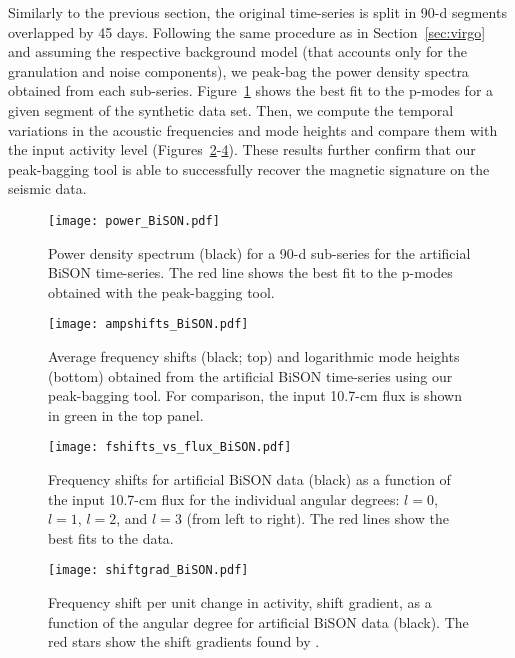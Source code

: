 \documentclass[twocolumn]{aastex61}%
\begin{document}
Similarly to the previous section, the original time-series is split in 90-d segments overlapped by 45 days. Following the same procedure as in Section~\ref{sec:virgo} and assuming the respective background model (that accounts only for the granulation and noise components), we peak-bag the power density spectra obtained from each sub-series.
Figure~\ref{fig:powersbison} shows the best fit to the p-modes for a given segment of the synthetic data set. Then, we compute the temporal variations in the acoustic frequencies and mode heights and compare them with the input activity level (Figures~\ref{fig:fshiftsbison}-\ref{fig:gradbison}). These results further confirm that our peak-bagging tool is able to successfully recover the magnetic signature on the seismic data. 

\begin{figure}[h]\centering
\texttt{[image: power\_BiSON.pdf]}\vspace{-0.2cm}
\caption{Power density spectrum (black) for a 90-d sub-series for the artificial BiSON time-series. The red line shows the best fit to the p-modes obtained with the peak-bagging tool.}\label{fig:powersbison}
\end{figure}

\begin{figure}[h]\centering
\texttt{[image: ampshifts\_BiSON.pdf]}\vspace{-0.2cm}
\caption{Average frequency shifts (black; top) and logarithmic mode heights (bottom) obtained from the artificial BiSON time-series using our peak-bagging tool. For comparison, the input 10.7-cm flux is shown in green in the top panel.}\label{fig:fshiftsbison}\vspace{2cm}
\end{figure}

\begin{figure}\centering
\texttt{[image: fshifts\_vs\_flux\_BiSON.pdf]}
\caption{Frequency shifts for artificial BiSON data (black) as a function of the input 10.7-cm flux for the individual angular degrees: $l=0$, $l=1$, $l=2$, and $l=3$ (from left to right). The red lines show the best fits to the data.}\label{fig:fluxbison}
\end{figure}

\begin{figure}\centering
\texttt{[image: shiftgrad\_BiSON.pdf]}
\caption{Frequency shift per unit change in activity, shift gradient, as a function of the angular degree for artificial BiSON data (black). The red stars show the shift gradients found by \citet{Chaplin2004}.}\label{fig:gradbison}\vspace{8cm}
\end{figure}
\clearpage
\end{document}
